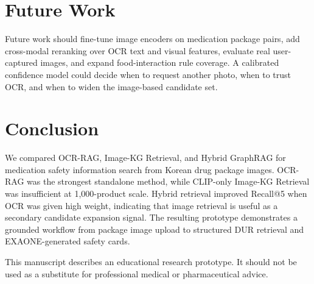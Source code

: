 \documentclass[sigconf,screen,nonacm]{acmart}
\begin{document}
\section{Future Work}
Future work should fine-tune image encoders on medication package pairs, add cross-modal reranking over OCR text and visual features, evaluate real user-captured images, and expand food-interaction rule coverage. A calibrated confidence model could decide when to request another photo, when to trust OCR, and when to widen the image-based candidate set.

\section{Conclusion}
We compared OCR-RAG, Image-KG Retrieval, and Hybrid GraphRAG for medication safety information search from Korean drug package images. OCR-RAG was the strongest standalone method, while CLIP-only Image-KG Retrieval was insufficient at 1,000-product scale. Hybrid retrieval improved Recall@5 when OCR was given high weight, indicating that image retrieval is useful as a secondary candidate expansion signal. The resulting prototype demonstrates a grounded workflow from package image upload to structured DUR retrieval and EXAONE-generated safety cards.

\begin{acks}
This manuscript describes an educational research prototype. It should not be used as a substitute for professional medical or pharmaceutical advice.
\end{acks}



\end{document}
